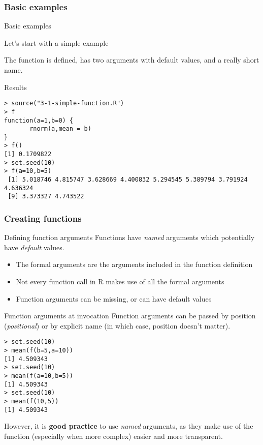 \documentclass[xcolor=table,compress]{beamer}
\begin{document}
\subsubsection[Examples]{Basic examples}
\begin{frame}[fragile]{Basic examples}
\begin{block}{Let's start with a simple example}

\end{block}
\pause
The function is defined, has two arguments with default values, and a really short name.
\pause
\begin{block}{Results}
\begin{lstlisting}
> source("3-1-simple-function.R")
> f
function(a=1,b=0) {
       rnorm(a,mean = b)
}
> f()
[1] 0.1709822
> set.seed(10)
> f(a=10,b=5)
 [1] 5.018746 4.815747 3.628669 4.400832 5.294545 5.389794 3.791924 4.636324
 [9] 3.373327 4.743522
\end{lstlisting}
\end{block}
\end{frame}


\subsubsection[Creatin]{Creating functions}
\begin{frame}{Defining function arguments}
Functions have \textit{named} arguments which potentially have \textit{default} values.
\begin{itemize}
\item The formal arguments are the arguments included in the function definition
\item Not every function call in R makes use of all the formal arguments
\item Function arguments can be missing, or can have default values
\end{itemize}
\end{frame}


\begin{frame}[fragile]{Function arguments at invocation}
Function arguments can be passed by position (\textit{positional}) or by explicit name (in which case, position doesn't matter).
\begin{lstlisting}[caption=Equivalent calls,basicstyle=\normalsize]
> set.seed(10)
> mean(f(b=5,a=10))
[1] 4.509343
> set.seed(10)
> mean(f(a=10,b=5))
[1] 4.509343
> set.seed(10)
> mean(f(10,5))
[1] 4.509343
\end{lstlisting}
However, it is \textbf{good practice} to use \textit{named} arguments, as they make use of the function (especially when more complex) easier and more transparent.
\end{frame}
\end{document}
